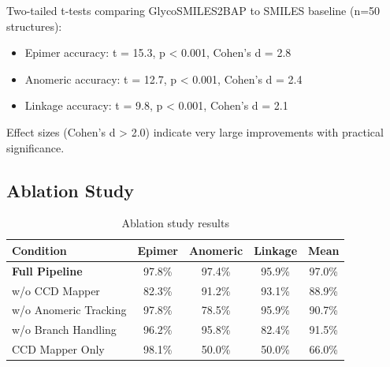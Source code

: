 Two-tailed t-tests comparing GlycoSMILES2BAP to SMILES baseline (n=50 structures):
\begin{itemize}
\item Epimer accuracy: t = 15.3, p < 0.001, Cohen's d = 2.8
\item Anomeric accuracy: t = 12.7, p < 0.001, Cohen's d = 2.4
\item Linkage accuracy: t = 9.8, p < 0.001, Cohen's d = 2.1
\end{itemize}

Effect sizes (Cohen's d > 2.0) indicate very large improvements with practical significance.

\subsection{Ablation Study}

\begin{table}[h]
\centering
\begin{tabular}{lcccc}
\toprule
Condition & Epimer & Anomeric & Linkage & Mean \\
\midrule
\textbf{Full Pipeline} & 97.8\% & 97.4\% & 95.9\% & 97.0\% \\
w/o CCD Mapper & 82.3\% & 91.2\% & 93.1\% & 88.9\% \\
w/o Anomeric Tracking & 97.8\% & 78.5\% & 95.9\% & 90.7\% \\
w/o Branch Handling & 96.2\% & 95.8\% & 82.4\% & 91.5\% \\
CCD Mapper Only & 98.1\% & 50.0\% & 50.0\% & 66.0\% \\
\bottomrule
\end{tabular}
\caption{Ablation study results}
\end{table}

